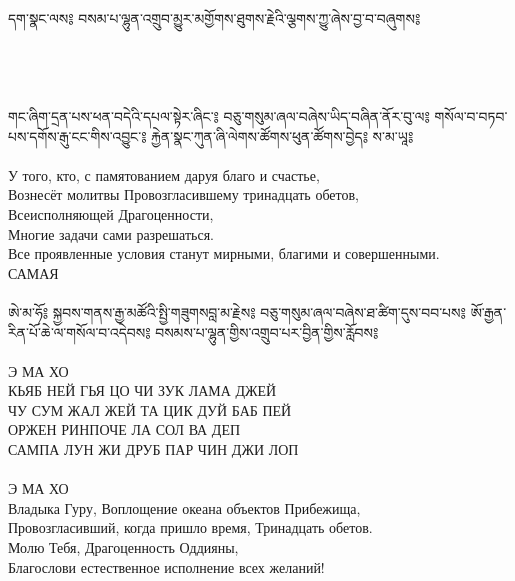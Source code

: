\documentclass[4pt,oneside]{article}
\begin{document}
   \thispagestyle{empty}

\ti དག་སྣང་ལས༔ བསམ་པ་ལྷུན་འགྲུབ་མྱུར་མགྱོགས་ཐུགས་རྗེའི་ལྕགས་ཀྱུ་ཞེས་བྱ་བ་བཞུགས༔
\ru {}\\
\\
\\
\vspace{1cm}
\\
\\ \ti གང་ཞིག་དྲན་པས་ཕན་བདེའི་དཔལ་སྟེར་ཞིང་༔ བཅུ་གསུམ་ཞལ་བཞེས་ཡིད་བཞིན་ནོར་བུ་ལ༔ གསོལ་བ་བཏབ་པས་དགོས་རྒུ་ངང་གིས་འབྱུང་༔ རྐྱེན་སྣང་ཀུན་ཞི་ལེགས་ཚོགས་ཕུན་ཚོགས་བྱེད༔ ས་མ་ཡཱ༔ \\
\\ \ru У того, кто, с памятованием даруя благо и счастье,\\
    Вознесёт молитвы Провозгласившему тринадцать обетов,\\
    \indent Всеисполняющей Драгоценности,\\
    Многие задачи сами разрешаться.\\
    Все проявленные условия станут мирными, благими и совершенными.\\
    САМАЯ\\

\\ \ti ཨེ་མ་ཧོ༔ སྐྱབས་གནས་རྒྱ་མཚོའི་སྤྱི་གཟུགསབླ་མ་རྗེས༔ བཅུ་གསུམ་ཞལ་བཞེས་ཐ་ཚིག་དུས་བབ་པས༔ ཨོ་རྒྱན་རིན་པོ་ཆེ་ལ་གསོལ་བ་འདེབས༔ བསམས་པ་ལྷུན་གྱིས་འགྲུབ་པར་བྱིན་གྱིས་རློབས༔ \\
\\ \ru Э МА ХО\\
    КЬЯБ НЕЙ ГЬЯ ЦО ЧИ ЗУК ЛАМА ДЖЕЙ\\
    ЧУ СУМ ЖАЛ ЖЕЙ ТА ЦИК ДУЙ БАБ ПЕЙ\\
    ОРЖЕН РИНПОЧЕ ЛА СОЛ ВА ДЕП\\
    САМПА ЛУН ЖИ ДРУБ ПАР ЧИН ДЖИ ЛОП\\
    \\
    Э МА ХО\\
    Владыка Гуру, Воплощение океана объектов Прибежища, \\
    Провозгласивший, когда пришло время, Тринадцать обетов. \\
    Молю Тебя, Драгоценность Оддияны, \\
    Благослови естественное исполнение всех желаний!\\

\newpage
\end{document}
